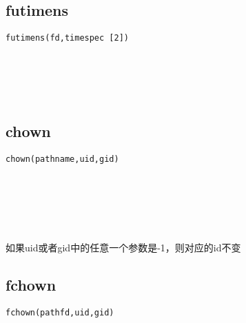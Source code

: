 \documentclass[10pt,a4paper]{article}
\begin{document}
\subsection{futimens}
\begin{spacing}{2.0}
\lstset{language=C,numbers=none}
\begin{lstlisting}
futimens(fd,timespec [2])
\end{lstlisting}
{\large\color[rgb]{0.2,0.4,0.6}{fd:}} \\
{\large\color[rgb]{0.2,0.4,0.6}{[2]:}}
\paragraph{ \ \ }
\end{spacing}

\section{\color[rgb]{0.2,0.4,0.6}{文件权限及所有者}}
\subsection{chown}
\begin{spacing}{2.0}
\lstset{language=C,numbers=none}
\begin{lstlisting}
chown(pathname,uid,gid)
\end{lstlisting}
{\large\color[rgb]{0.2,0.4,0.6}{pathname:}} \\
{\large\color[rgb]{0.2,0.4,0.6}{uid:}} \\
{\large\color[rgb]{0.2,0.4,0.6}{gid:}}
\paragraph{ \ \ }如果uid或者gid中的任意一个参数是-1，则对应的id不变
\end{spacing}

\subsection{fchown}
\begin{spacing}{2.0}
\lstset{language=C,numbers=none}
\begin{lstlisting}
fchown(pathfd,uid,gid)
\end{lstlisting}
{\large\color[rgb]{0.2,0.4,0.6}{pathfd:}} \\
{\large\color[rgb]{0.2,0.4,0.6}{uid:}} \\
{\large\color[rgb]{0.2,0.4,0.6}{gid:}}
\paragraph{ \ \ }
\end{spacing}
\end{document}
